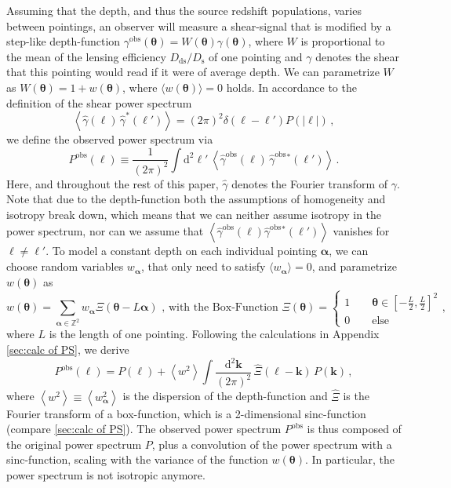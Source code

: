\documentclass[referee]{aa} %
\renewcommand{\[}{\begin{equation}}
\renewcommand{\]}{\end{equation}}
\renewcommand{\rm}{\mathrm}
\def\b#1{\bm{#1}}
\def\Dds{D_{\rm{ds}}}
\def\Ds{D_{\rm{s}}}
\def\la{\left<}
\def\ra{\right>}
\def\gammao{\gamma^{\text{obs}}}
\def\gammaoh{\hat{\gamma}^{\text{obs}}}
\def\d{\rm{d}}
\begin{document}
Assuming that the depth, and thus the source redshift populations, varies between pointings, an observer will measure a shear-signal that is modified by a step-like depth-function $\gammao(\b\theta)=W(\b \theta)\gamma(\b\theta)$, where $W$ is proportional to the mean of the lensing efficiency $\Dds/\Ds$ of one pointing and $\gamma$ denotes the shear that this pointing would read if it were of average depth.
We can parametrize $W$ as $W(\bm{\theta}) = 1+w(\bm{\theta})$, where $\langle w(\bm{\theta})\rangle=0$ holds. 
In accordance to the definition of the shear power spectrum \begin{equation}
\la \hat{\gamma}(\b\ell)\,\hat{\gamma}^*(\b\ell')\ra = (2\pi)^2\delta(\b\ell-\b\ell')P(|\b\ell|) \, ,
\end{equation}
we define the observed power spectrum via \begin{equation}
P^{\text{obs}}(\b\ell) \equiv \frac{1}{(2\pi)^2}\int \d^2 \ell'\,  \la \gammaoh(\b \ell)\, \gammaoh {}^*(\b \ell')\ra \, .
\end{equation}
Here, and throughout the rest of this paper, $\hat{\gamma}$ denotes the Fourier transform of $\gamma$. Note that due to the depth-function both the assumptions of homogeneity and isotropy break down, which means that we can neither assume isotropy in the power spectrum, nor can we assume that $\la \gammaoh(\b \ell) \gammaoh {}^*(\b \ell')\ra$ vanishes for $\b\ell\neq\b\ell'$.
To model a constant depth on each individual pointing $\b \alpha$, we can choose random variables $w_{\b \alpha}$, that only need to satisfy $\langle w_{\b \alpha}\rangle=0$, and parametrize $w(\b\theta)$ as 
\begin{equation}
w(\b \theta) = \sum_{\b \alpha \in \mathbb{Z}^2} w_{\b \alpha} \Xi(\b \theta-L\b \alpha)\text{ , with the Box-Function } \Xi(\b \theta) = \begin{cases}
1 \qquad \b \theta\in \left[-\frac{L}{2},\frac{L}{2}\right]^2 \\
0 \qquad \text{else}
\end{cases},
\label{eq:defweightf}
\end{equation}
where $L$ is the length of one pointing.
Following the calculations in Appendix \ref{sec:calc of PS}, we derive 
\begin{equation}
P^{\text{obs}}(\b \ell)  =  P(\b \ell) + \la w^2\ra \int\frac{\text{d}^2\b k}{(2\pi)^2}\,\hat{\Xi}(\b \ell-\b k)\, P(\b k)\, ,
\end{equation}
where $\la w^2\ra \equiv \la w_{\b \alpha}^2\ra$ is the dispersion of the depth-function and $\hat{\Xi}$ is the Fourier transform of a box-function, which is a 2-dimensional sinc-function (compare \ref{sec:calc of PS}).
The observed power spectrum $P^{\text{obs}}$ is thus composed of the original power spectrum $P$, plus a convolution of the power spectrum with a sinc-function, scaling with the variance of the function $w(\b\theta)$. In particular, the power spectrum is not isotropic anymore.
\end{document}
